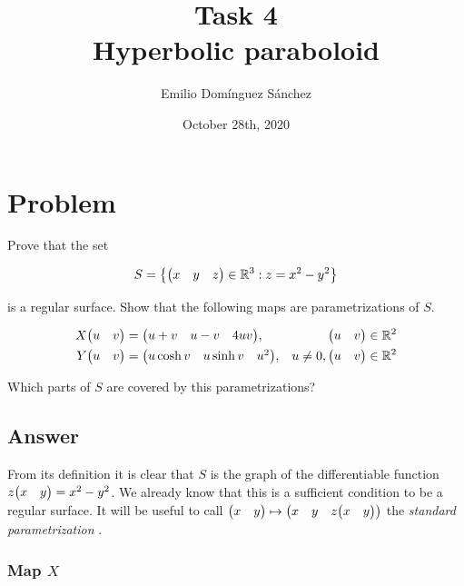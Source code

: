 \documentclass[
    12pt, %
]{fphw}
\title{Task 4 \\ Hyperbolic paraboloid} %
\author{Emilio Domínguez Sánchez} %
\date{October 28th, 2020} %
\institute{University of Murcia \\ Faculty of Mathematics} %
\makeatletter
\newcommand{\defined}[2]{%
  \phantomsection
  \textit{#1}\def\@currentlabel{\unexpanded{#1}}\label{#2}%
}
\newcommand{\R}{\mathbb{R}}
\makeatother
\begin{document}
\maketitle %


\section*{Problem}

\begin{problem}

Prove that the set

\begin{equation*}
    S = \qty{\mqty(x & y & z) \in \R^3 : z = x^2 - y^2}
\end{equation*}

is a regular surface.
Show that the following maps are parametrizations of $S$.

\begin{align*}
    X\mqty(u & v) &= \mqty(u+v & u-v & 4uv), & \mqty(u & v) \in \R^2 \\
%
    Y\mqty(u & v) &= \mqty(u\cosh v & u\sinh v & u^2), & u \neq 0, \mqty(u & v) \in \R^2
\end{align*}

Which parts of $S$ are covered by this parametrizations?

\end{problem}


\subsection*{Answer}

    From its definition it is clear that $S$ is the graph of the differentiable function
$z\mqty(x & y) = x^2 - y^2$.
We already know that this is a sufficient condition to be a regular surface.
It will be useful to call $\mqty(x & y) \mapsto \mqty(x & y & z\mqty(x & y))$ the
\defined{standard parametrization}{name:std-par}.

\subsubsection*{Map $X$}
\end{document}
